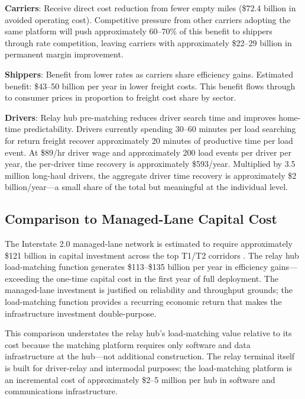 \textbf{Carriers}: Receive direct cost reduction from fewer empty miles (\$72.4 billion in avoided operating cost). Competitive pressure from other carriers adopting the same platform will push approximately 60--70\% of this benefit to shippers through rate competition, leaving carriers with approximately \$22--29 billion in permanent margin improvement.

\textbf{Shippers}: Benefit from lower rates as carriers share efficiency gains. Estimated benefit: \$43--50 billion per year in lower freight costs. This benefit flows through to consumer prices in proportion to freight cost share by sector.

\textbf{Drivers}: Relay hub pre-matching reduces driver search time and improves home-time predictability. Drivers currently spending 30--60 minutes per load searching for return freight recover approximately 20 minutes of productive time per load event. At \$89/hr driver wage \citep{ATRI_costs2024} and approximately 200 load events per driver per year, the per-driver time recovery is approximately \$593/year. Multiplied by 3.5 million long-haul drivers, the aggregate driver time recovery is approximately \$2 billion/year---a small share of the total but meaningful at the individual level.

\subsection{Comparison to Managed-Lane Capital Cost}

The Interstate 2.0 managed-lane network is estimated to require approximately \$121 billion in capital investment across the top T1/T2 corridors \citep{ROUTE_C1}. The relay hub load-matching function generates \$113--\$135 billion per year in efficiency gains---exceeding the one-time capital cost in the first year of full deployment. The managed-lane investment is justified on reliability and throughput grounds; the load-matching function provides a recurring economic return that makes the infrastructure investment double-purpose.

This comparison understates the relay hub's load-matching value relative to its cost because the matching platform requires only software and data infrastructure at the hub---not additional construction. The relay terminal itself is built for driver-relay and intermodal purposes; the load-matching platform is an incremental cost of approximately \$2--5 million per hub in software and communications infrastructure.
